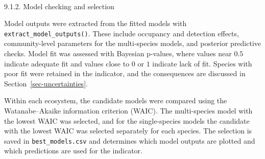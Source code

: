 \documentclass[
  letterpaper,
  DIV=11,
  numbers=noendperiod]{scrartcl}
\makeatletter
\let\oldparagraph\paragraph
\renewcommand{\paragraph}{
    \@ifstar
      \xxxParagraphStar
      \xxxParagraphNoStar
  }
\newcommand{\xxxParagraphStar}[1]{\oldparagraph*{#1}\mbox{}}
\newcommand{\xxxParagraphNoStar}[1]{\oldparagraph{#1}\mbox{}}
\newenvironment{Shaded}{\begin{snugshade}}{\end{snugshade}}
\newcommand{\AttributeTok}[1]{\textcolor[rgb]{0.40,0.45,0.13}{#1}}
\newcommand{\ConstantTok}[1]{\textcolor[rgb]{0.56,0.35,0.01}{#1}}
\newcommand{\FunctionTok}[1]{\textcolor[rgb]{0.28,0.35,0.67}{#1}}
\newcommand{\NormalTok}[1]{\textcolor[rgb]{0.00,0.23,0.31}{#1}}
\newcommand{\OtherTok}[1]{\textcolor[rgb]{0.00,0.23,0.31}{#1}}
\newcommand{\SpecialCharTok}[1]{\textcolor[rgb]{0.37,0.37,0.37}{#1}}
\newcommand{\StringTok}[1]{\textcolor[rgb]{0.13,0.47,0.30}{#1}}
\makeatother
\begin{document}
\paragraph{9.1.2. Model checking and
selection}\label{model-checking-and-selection}

Model outputs were extracted from the fitted models with
\texttt{extract\_model\_outputs()}. These include occupancy and
detection effects, community-level parameters for the multi-species
models, and posterior predictive checks. Model fit was assessed with
Bayesian p-values, where values near \(0.5\) indicate adequate fit and
values close to \(0\) or \(1\) indicate lack of fit. Species with poor
fit were retained in the indicator, and the consequences are discussed
in Section~\ref{sec-uncertainties}.

\begin{Shaded}
\end{Shaded}

Within each ecosystem, the candidate models were compared using the
Watanabe--Akaike information criterion (WAIC). The multi-species model
with the lowest WAIC was selected, and for the single-species models the
candidate with the lowest WAIC was selected separately for each species.
The selection is saved in \texttt{best\_models.csv} and determines which
model outputs are plotted and which predictions are used for the
indicator.
\end{document}
